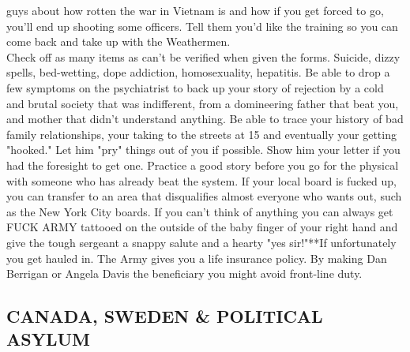 \documentclass[11pt,twoside,a4paper]{book}
\begin{document}
guys about how rotten the war in Vietnam is and how if you get forced to go, you'll end up shooting some officers. Tell them you'd like the training so you can come back and take up with the Weathermen.~\\

Check off as many items as can't be verified when given the forms. Suicide, dizzy spells, bed-wetting, dope addiction, homosexuality, hepatitis. Be able to drop a few symptoms on the psychiatrist to back up your story of rejection by a cold and brutal society that was indifferent, from a domineering father that beat you, and mother that didn't understand anything. Be able to trace your history of bad family relationships, your taking to the streets at 15 and eventually your getting "hooked."  Let him "pry" things out of you if possible. Show him your letter if you had the foresight to get one. Practice a good story before you go for the physical with someone who has already beat the system. If your local board is fucked up, you can transfer to an area that disqualifies almost everyone who wants out, such as the New York City boards. If you can't think of anything you can always get FUCK ARMY tattooed on the outside of the baby finger of your right hand and give the tough sergeant a snappy salute and a hearty "yes sir!"**If unfortunately you get hauled in. The Army gives you a life insurance policy. By making Dan Berrigan or Angela Davis the beneficiary you might avoid front-line duty. 

\subsection{CANADA, SWEDEN \& POLITICAL ASYLUM}
\end{document}
